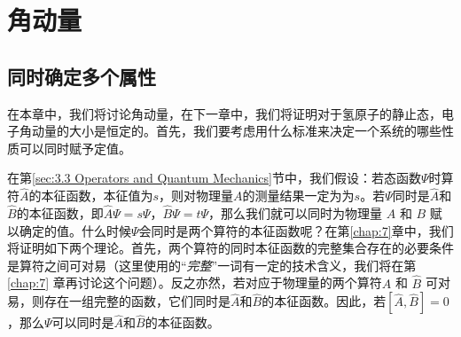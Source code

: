 \chapter{角动量}
\label{chap:5}
\section{同时确定多个属性}
\label{sec:5.1 Simultaneous Specification of Several Properties}
    在本章中，我们将讨论角动量，在下一章中，我们将证明对于氢原子的静止态，电子角动量的大小是恒定的。首先，我们要考虑用什么标准来决定一个系统的哪些性质可以同时赋予定值。

    在第\ref{sec:3.3 Operators and Quantum Mechanics}节中，我们假设：若态函数$\Psi$时算符$\hat{A}$的本征函数，本征值为$s$，则对物理量$A$的测量结果一定为为$s$。若$\Psi$同时是$\hat{A}$和$\hat{B}$的本征函数，即$\hat{A}\Psi=s\Psi$，$\hat{B}\Psi=t\Psi$，那么我们就可以同时为物理量 $A$ 和 $B$ 赋以确定的值。什么时候$\Psi$会同时是两个算符的本征函数呢？在第\ref{chap:7}章中，我们将证明如下两个理论。首先，两个算符的同时本征函数的完整集合存在的必要条件是算符之间可对易（这里使用的“\textit{完整}”一词有一定的技术含义，我们将在第 \ref{chap:7} 章再讨论这个问题）。反之亦然，若对应于物理量的两个算符$\hat{A}$ 和 $\hat{B}$ 可对易，则存在一组完整的函数，它们同时是$\hat{A}$和$\hat{B}$的本征函数。因此，若$\left[\hat{A},\hat{B}\right]=0$，那么$\Psi$可以同时是$\hat{A}$和$\hat{B}$的本征函数。

